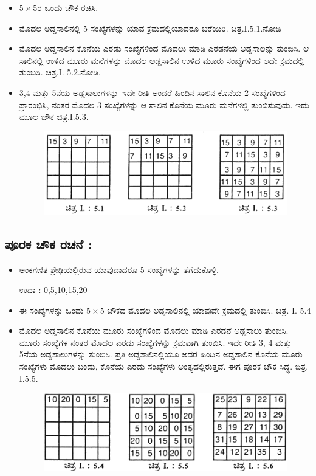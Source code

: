 \begin{itemize}
	\item $5 \times 5$ರ ಒಂದು ಚೌಕ ರಚಿಸಿ.

	\item ಮೊದಲ ಅಡ್ಡಸಾಲಿನಲ್ಲಿ 5 ಸಂಖ್ಯೆಗಳನ್ನು ಯಾವ ಕ್ರಮದಲ್ಲಿಯಾದರೂ ಬರೆಯಿರಿ. ಚಿತ್ರ.I.5.1.ನೋಡಿ

	\item ಮೊದಲ ಅಡ್ಡಸಾಲಿನ ಕೊನೆಯ ಎರಡು ಸಂಖ್ಯೆಗಳಿಂದ ಮೊದಲು ಮಾಡಿ ಎರಡನೆಯ ಅಡ್ಡಸಾಲನ್ನು ತುಂಬಿಸಿ. ಆ ಸಾಲಿನಲ್ಲಿ ಉಳಿದ ಮೂರು ಮನೆಗಳನ್ನು ಮೊದಲ ಅಡ್ಡಸಾಲಿನ ಉಳಿದ ಮೂರು ಸಂಖ್ಯೆಗಳಿಂದ ಅದೇ ಕ್ರಮದಲ್ಲಿ ತುಂಬಿಸಿ. ಚಿತ್ರ.I. 5.2.ನೋಡಿ.

	\item 3,4 ಮತ್ತು 5ನೆಯ ಅಡ್ಡಸಾಲುಗಳನ್ನು ಇದೇ ರೀತಿ ಅಂದರೆ ಹಿಂದಿನ ಸಾಲಿನ ಕೊನೆ\-ಯ 2 ಸಂಖ್ಯೆಗಳಿಂದ ಪ್ರಾರಂಭಿಸಿ, ನಂತರ ಮೊದಲ 3 ಸಂಖ್ಯೆಗಳನ್ನು ಆ ಸಾಲಿನ ಕೊನೆಯ ಮೂರು ಮನೆಗಳಲ್ಲಿ ತುಂಬಿಸುವುದು. ಇದು ಮೂಲ ಚೌಕ ಚಿತ್ರ.I.5.3.

	\begin{figure}[H]
	\includegraphics[scale=.95]{src/figures/chap3/fig3-11.jpg}
	\end{figure}
\end{itemize}

\subsection*{ಪೂರಕ ಚೌಕ ರಚನೆ :}

\begin{itemize}
	\item ಅಂಕಗಣಿತ ಶ್ರೇಢಿಯಲ್ಲಿರುವ ಯಾವುದಾದರೂ 5 ಸಂಖ್ಯೆಗಳನ್ನು ತೆಗೆದುಕೊಳ್ಳಿ.

	ಉದಾ : 0,5,10,15,20
	\item ಈ ಸಂಖ್ಯೆಗಳನ್ನು ಒಂದು $5 \times 5$ ಚೌಕದ ಮೊದಲ ಅಡ್ಡಸಾಲಿನಲ್ಲಿ ಯಾವುದೇ ಕ್ರಮದಲ್ಲಿ ತುಂಬಿಸಿ. ಚಿತ್ರ. I. 5.4
	\item ಮೊದಲ ಅಡ್ಡಸಾಲಿನ ಕೊನೆಯ ಮೂರು ಸಂಖ್ಯೆಗಳಿಂದ ಮೊದಲು ಮಾಡಿ ಎರಡನೆ ಅಡ್ಡಸಾಲು ತುಂಬಿಸಿ. ಮೂರು ಸಂಖ್ಯೆಗಳ ನಂತರ ಮೊದಲ ಎರಡು ಸಂಖ್ಯೆಗಳನ್ನು ಕ್ರಮವಾಗಿ ತುಂಬಿಸಿ. ಇದೇ ರೀತಿ 3, 4 ಮತ್ತು 5ನೆಯ ಅಡ್ಡಸಾಲುಗಳನ್ನು ತುಂಬಿಸಿ. ಪ್ರತಿ ಅಡ್ಡಸಾಲಿನಲ್ಲಿಯೂ ಅದರ ಹಿಂದಿನ ಅಡ್ಡಸಾಲಿನ ಕೊನೆಯ ಮೂರು ಸಂಖ್ಯೆಗಳು ಮೊದಲು ಬಂದು, ಕೊನೆಯ ಎರಡು ಸಂಖ್ಯೆಗಳು ಅಂತ್ಯದಲ್ಲಿರುತ್ತವೆ. ಈಗ ಪೂರಕ ಚೌಕ ಸಿದ್ಧ. ಚಿತ್ರ. I.5.5.
	\begin{figure}[H]
	\includegraphics{src/figures/chap3/fig3-12.jpg}
	\end{figure}
\end{itemize}

